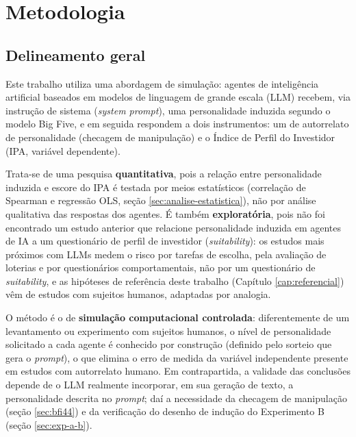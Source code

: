 \chapter{Metodologia}
\label{cap:metodologia}

\section{Delineamento geral}

Este trabalho utiliza uma abordagem de simulação: agentes de inteligência
artificial baseados em modelos de linguagem de grande escala (LLM) recebem,
via instrução de sistema (\textit{system prompt}), uma personalidade
induzida segundo o modelo Big Five, e em seguida respondem a dois
instrumentos: um de autorrelato de personalidade (checagem de manipulação)
e o Índice de Perfil do Investidor (IPA, variável dependente).

Trata-se de uma pesquisa \textbf{quantitativa}, pois a relação entre
personalidade induzida e escore do IPA é testada por meios estatísticos
(correlação de Spearman e regressão OLS, seção \ref{sec:analise-estatistica}),
não por análise qualitativa das respostas dos agentes. É também
\textbf{exploratória}, pois não foi encontrado um estudo anterior que
relacione personalidade induzida em agentes de IA a um questionário de
perfil de investidor (\textit{suitability}): os estudos mais próximos com
LLMs \cite{borman2024,hartley2025} medem o risco por tarefas de escolha,
pela avaliação de loterias e por questionários comportamentais, não por um questionário de
\textit{suitability}, e as hipóteses de referência deste trabalho
(Capítulo \ref{cap:referencial}) vêm de estudos com sujeitos humanos,
adaptadas por analogia.

O método é o de \textbf{simulação computacional controlada}:
diferentemente de um levantamento ou experimento com sujeitos humanos, o
nível de personalidade solicitado a cada agente é conhecido por construção
(definido pelo sorteio que gera o \textit{prompt}), o que elimina o erro
de medida da variável independente presente em estudos com autorrelato
humano. Em contrapartida, a validade das conclusões depende de o LLM realmente
incorporar, em sua geração de texto, a personalidade descrita no
\textit{prompt}; daí a necessidade da checagem de manipulação (seção
\ref{sec:bfi44}) e da verificação do desenho de indução do Experimento B (seção
\ref{sec:exp-a-b}).

